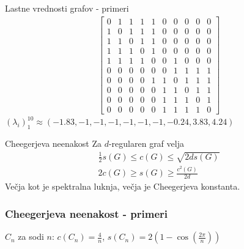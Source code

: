 \documentclass{beamer}
\begin{document}
\begin{frame}{Lastne vrednosti grafov - primeri}
    \begin{align*}
        \begin{bmatrix}
            0 & 1 & 1 & 1 & 1 & 0 & 0 & 0 & 0 & 0 \\
            1 & 0 & 1 & 1 & 1 & 0 & 0 & 0 & 0 & 0 \\
            1 & 1 & 0 & 1 & 1 & 0 & 0 & 0 & 0 & 0 \\
            1 & 1 & 1 & 0 & 1 & 0 & 0 & 0 & 0 & 0 \\
            1 & 1 & 1 & 1 & 0 & 0 & 1 & 0 & 0 & 0 \\
            0 & 0 & 0 & 0 & 0 & 0 & 1 & 1 & 1 & 1 \\
            0 & 0 & 0 & 0 & 1 & 1 & 0 & 1 & 1 & 1 \\
            0 & 0 & 0 & 0 & 0 & 1 & 1 & 0 & 1 & 1 \\
            0 & 0 & 0 & 0 & 0 & 1 & 1 & 1 & 0 & 1 \\
            0 & 0 & 0 & 0 & 0 & 1 & 1 & 1 & 1 & 0
        \end{bmatrix}
    \end{align*}
    \((\lambda_i)_1^{10} \approx (-1.83, -1, -1, -1, -1, -1, -1, -0.24, 3.83, 4.24)\)
\end{frame}
\begin{frame}{Cheegerjeva neenakost}
    Za \(d\)-regularen graf velja
    \begin{align*}
        \frac{1}{2}s(G)\leq c(G) \leq \sqrt{2d s(G)} \\
        2c(G) \geq s(G) \geq \frac{c^2(G)}{2d}
    \end{align*}
    Večja kot je spektralna luknja, večja je Cheegerjeva konstanta.
\end{frame}
\begin{frame}
    \frametitle{Cheegerjeva neenakost - primeri}
    \(C_n\) za sodi \(n\): \(c(C_n) = \frac{4}{n}\), \(s(C_n) = 2\left(1-\cos\left(\frac{2\pi}{n}\right)\right)\)

\end{frame}
\end{document}
